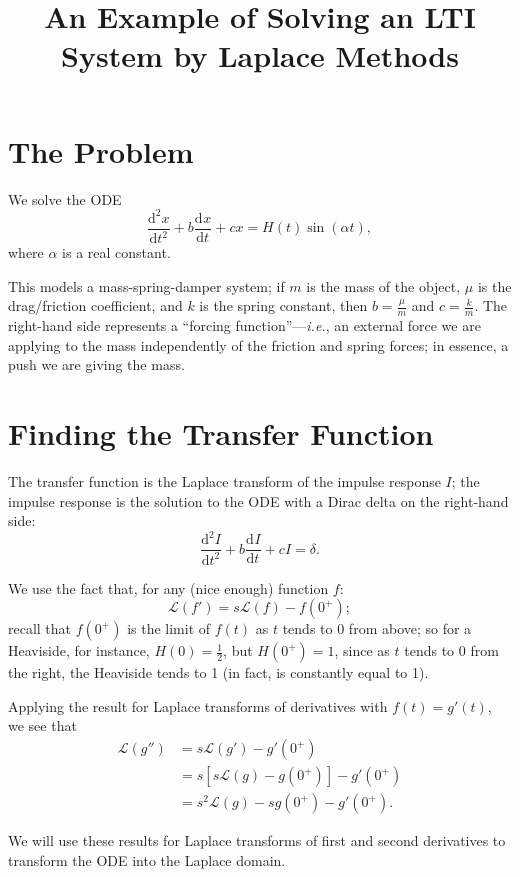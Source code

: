 \documentclass{article}
\newcommand{\deriv}[3][]{\frac{\mathrm{d}^{#1}#2}{\mathrm{d}#3^{#1}}}
\begin{document}
\title{An Example of Solving an LTI System by Laplace Methods}
\date{}

\maketitle
\thispagestyle{empty}

\Large


\section{The Problem}

We solve the ODE
\[\deriv[2]{x}{t}+b\deriv{x}{t}+cx=H(t)\sin(\alpha t),\]
where $\alpha$ is a real constant.\bigskip

This models a mass-spring-damper system; if $m$ is the mass of the object, $\mu$ is the drag/friction coefficient, and $k$ is the spring constant, then $b=\frac{\mu}{m}$ and $c=\frac{k}{m}$. The right-hand side represents a ``forcing function''---\textit{i.e.}, an external force we are applying to the mass independently of the friction and spring forces; in essence, a push we are giving the mass.


\section{Finding the Transfer Function}


The transfer function is the Laplace transform of the impulse response $I$; the impulse response is the solution to the ODE with a Dirac delta on the right-hand side:
\[\deriv[2]{I}{t}+b\deriv{I}{t}+cI=\delta.\]

We use the fact that, for any (nice enough) function $f$:
\[\mathcal{L}(f')=s\mathcal{L}(f)-f(0^+);\]
recall that $f(0^+)$ is the limit of $f(t)$ as $t$ tends to 0 from above; so for a Heaviside, for instance, $H(0)=\frac{1}{2}$, but $H(0^+)=1$, since as $t$ tends to 0 from the right, the Heaviside tends to 1 (in fact, is constantly equal to 1).

Applying the result for Laplace transforms of derivatives with $f(t)=g'(t)$, we see that
\begin{align*}
\mathcal{L}(g'')&=s\mathcal{L}(g')-g'(0^+)\\
&=s\left[s\mathcal{L}(g)-g(0^+)\right]-g'(0^+)\\
&=s^2\mathcal{L}(g)-sg(0^+)-g'(0^+).
\end{align*}

We will use these results for Laplace transforms of first and second derivatives to transform the ODE into the Laplace domain.
\end{document}
